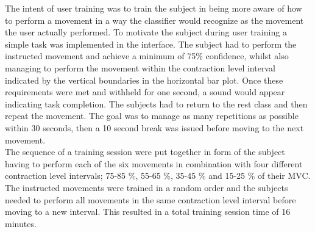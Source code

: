The intent of user training was to train the subject in being more aware of how to perform a movement in a way the classifier would recognize as the movement the user actually performed. To motivate the subject during user training a simple task was implemented in the interface.  The subject had to perform the instructed movement and achieve a minimum of 75\% confidence, whilst also managing to perform the movement within the contraction level interval indicated by the vertical boundaries in the horizontal bar plot. Once these requirements were met and withheld for one second, a sound would appear indicating task completion. The subjects had to return to the rest class and then repeat the movement. The goal was to manage as many repetitions as possible within 30 seconds, then a 10 second break was issued before moving to the next movement. \\
The sequence of a training session were put together in form of the subject having to perform each of the six movements in combination with four different contraction level intervals; 75-85 \%, 55-65 \%, 35-45 \% and 15-25 \% of their MVC. The instructed movements were trained in a random order and the subjects needed to perform all movements in the same contraction level interval before moving to a new interval. This resulted in a total training session time of 16 minutes.         


